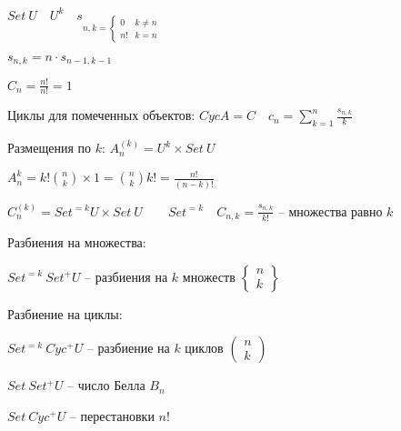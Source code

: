 \documentclass{book}
\theoremstyle{definition}
\begin{document}
$Set~U\quad U^k\quad s_{n,k = \begin{cases}
        0&k\neq n\\
        n!&k=n
\end{cases}}$ 

$s_{n,k} = n\cdot s_{n-1,k-1}$

$C_n = \frac{n!}{n!} = 1$


Циклы для помеченных объектов: $Cyc A = C\quad c_n = \sum_{k=1}^{n} \frac{s_{n,k}}{k}$ 

Размещения по $k$:  $A_n^{(k)} = U^k\times Set~U$ 

$A_n^k = k!{n\choose k}\times 1 = {n\choose k}k! = \frac{n!}{(n-k)!}$ 

    $C_n^{(k)} = Set^{=k}U\times Set~U\qquad Set^{=k}\quad C_{n,k} = \frac{s_{n,k}}{k!}$ -- множества равно $k$


Разбиения на множества:

$Set^{=k}~Set^{+}U$ -- разбиения на  $k$ множеств $
\begin{Bmatrix}
    n \\ k
\end{Bmatrix} $

Разбиение на циклы:

$Set^{=k}~Cyc^{+}U$ -- разбиение на  $k$ циклов  $\begin{pmatrix} n\\k \end{pmatrix} $

$Set~Set^{+}U$ -- число Белла  $B_n$

$Set~Cyc^{+}U$ -- перестановки  $n!$

  
\end{document}
